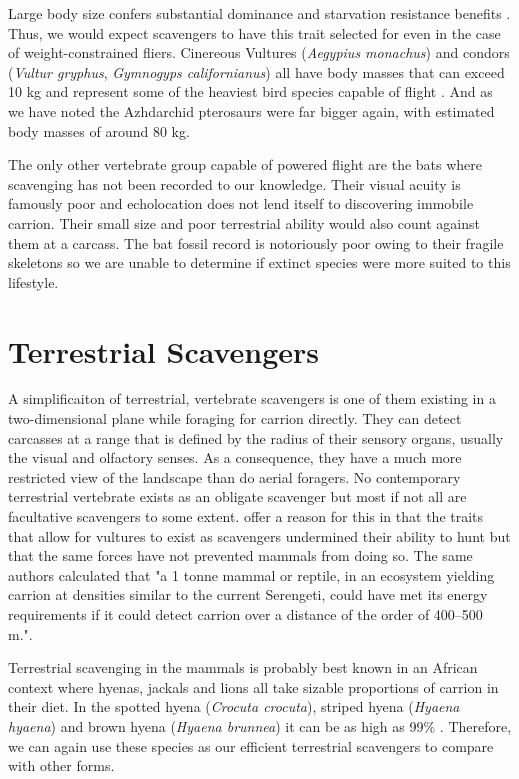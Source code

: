 \documentclass[a4paper,12pt]{article}
\begin{document}
Large body size confers substantial dominance and starvation resistance benefits \citep{ruxton2004obligate}. Thus, we would expect scavengers to have this trait selected for even in the case of weight-constrained fliers. Cinereous Vultures (\textit{Aegypius monachus}) and condors (\textit{Vultur gryphus}, \textit{Gymnogyps californianus}) all have body masses that can exceed 10 kg and represent some of the heaviest bird species capable of flight \citep{ferguson2001raptors,donazar2002effects}. And as we have noted the Azhdarchid pterosaurs were far bigger again, with estimated body masses of around 80 kg. 
 
The only other vertebrate group capable of powered flight are the bats where scavenging has not been recorded to our knowledge. Their visual acuity is famously poor and echolocation does not lend itself to discovering immobile carrion. Their small size and poor terrestrial ability would also count against them at a carcass. The bat fossil record is notoriously poor owing to their fragile skeletons so we are unable to determine if extinct species were more suited to this lifestyle. 

\section*{Terrestrial Scavengers}
A simplificaiton of terrestrial, vertebrate scavengers is one of them existing in a two-dimensional plane while foraging for carrion directly. They can detect carcasses at a range that is defined by the radius of their sensory organs, usually the visual and olfactory senses. As a consequence, they have a much more restricted view of the landscape than do aerial foragers. No contemporary terrestrial vertebrate exists as an obligate scavenger but most if not all are facultative scavengers to some extent. \cite{ruxton2004obligate} offer a reason for this in that the traits that allow for vultures to exist as scavengers undermined their ability to hunt but that the same forces have not prevented mammals from doing so. The same authors calculated that "a 1 tonne mammal or reptile, in an ecosystem yielding carrion at densities similar to the current Serengeti, could have met its energy requirements if it could detect carrion over a distance of the order of 400–500 m."\citep{ruxton2004obligate}. 

Terrestrial scavenging in the mammals is probably best known in an African context where hyenas, jackals and lions all take sizable proportions of carrion in their diet. In the spotted hyena (\textit{Crocuta crocuta}), striped hyena (\textit{Hyaena hyaena}) and brown hyena (\textit{Hyaena brunnea}) it can be as high as 99\% \citep{benbow2015introduction}. Therefore, we can again use these species as our efficient terrestrial scavengers to compare with other forms. 
\end{document}
